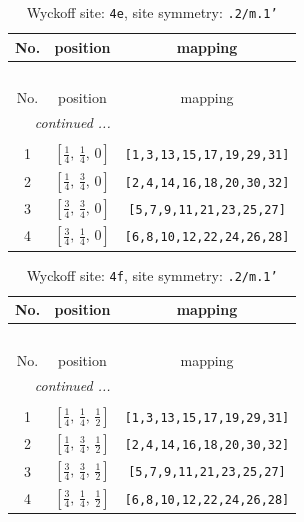 \documentclass[fleqn,8pt]{jsarticle}
\begin{document}
\renewcommand{\arraystretch}{1.2}
\begin{longtable}{ccc}
\caption{Wyckoff site: {\tt 4e}, site symmetry: {\tt .2/m.1'}}
 \\
 \hline \hline
No. & position & mapping \\ \hline \endfirsthead

\multicolumn{2}{l}{\tablename\ \thetable{}} \\
 \hline \hline
No. & position & mapping \\ \hline \endhead

 \hline \hline
\multicolumn{2}{r}{\footnotesize\it continued ...} \\ \endfoot

 \hline \hline
\multicolumn{2}{r}{} \\ \endlastfoot

1 & $\left[ \frac{1}{4},\, \frac{1}{4},\, 0 \right]$ & {\tt [1,3,13,15,17,19,29,31]} \\ \hline
2 & $\left[ \frac{1}{4},\, \frac{3}{4},\, 0 \right]$ & {\tt [2,4,14,16,18,20,30,32]} \\ \hline
3 & $\left[ \frac{3}{4},\, \frac{3}{4},\, 0 \right]$ & {\tt [5,7,9,11,21,23,25,27]} \\ \hline
4 & $\left[ \frac{3}{4},\, \frac{1}{4},\, 0 \right]$ & {\tt [6,8,10,12,22,24,26,28]} \\
\end{longtable}
\renewcommand{\arraystretch}{1.2}
\begin{longtable}{ccc}
\caption{Wyckoff site: {\tt 4f}, site symmetry: {\tt .2/m.1'}}
 \\
 \hline \hline
No. & position & mapping \\ \hline \endfirsthead

\multicolumn{2}{l}{\tablename\ \thetable{}} \\
 \hline \hline
No. & position & mapping \\ \hline \endhead

 \hline \hline
\multicolumn{2}{r}{\footnotesize\it continued ...} \\ \endfoot

 \hline \hline
\multicolumn{2}{r}{} \\ \endlastfoot

1 & $\left[ \frac{1}{4},\, \frac{1}{4},\, \frac{1}{2} \right]$ & {\tt [1,3,13,15,17,19,29,31]} \\ \hline
2 & $\left[ \frac{1}{4},\, \frac{3}{4},\, \frac{1}{2} \right]$ & {\tt [2,4,14,16,18,20,30,32]} \\ \hline
3 & $\left[ \frac{3}{4},\, \frac{3}{4},\, \frac{1}{2} \right]$ & {\tt [5,7,9,11,21,23,25,27]} \\ \hline
4 & $\left[ \frac{3}{4},\, \frac{1}{4},\, \frac{1}{2} \right]$ & {\tt [6,8,10,12,22,24,26,28]} \\
\end{longtable}
\end{document}

